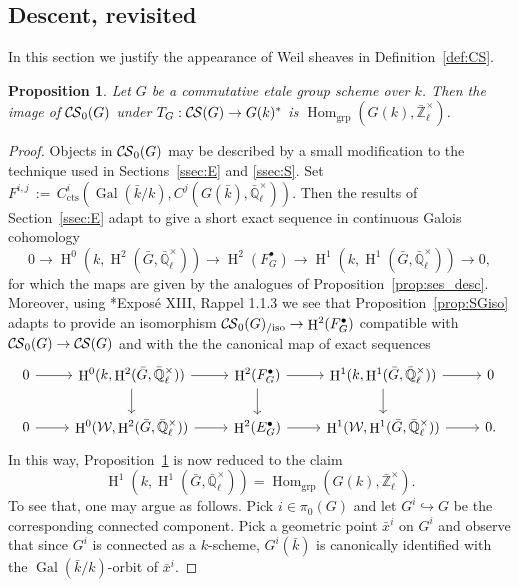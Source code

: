 \documentclass[10pt]{amsart}
\theoremstyle{plain}
\newtheorem{proposition}[theorem]{Proposition}
\theoremstyle{definition}
\theoremstyle{remark}
\newcommand{\EE}{\mathbb{\bar Q}_\ell}
\newcommand{\bFq}{\bar{k}}
\newcommand{\Fq}{k}
\newcommand{\EEx}{\EE^\times}
\newcommand{\Weil}[1]{\mathcal{W}_{#1}}
\DeclareMathOperator{\Gal}{Gal}
\DeclareMathOperator{\Hom}{Hom}
\DeclareMathOperator{\Hh}{H}
\newcommand{\ceq}{{\, :=\, }}
\newcommand{\TrFrob}[1]{T_{#1}}
\newcommand{\CS}{{\mathcal{C\hskip-0.8pt S}}}
\newcommand{\bCS}{{\CS_0}}
\newcommand{\bCSiso}[1]{\bCS(#1)_{/\text{iso}}}
\begin{document}
\subsection{Descent, revisited}\label{ssec:bS}

In this section we justify the appearance of Weil sheaves in Definition~\ref{def:CS}.

\begin{proposition}\label{prop:bounded-etale}
Let $G$ be a commutative etale group scheme over $\Fq$.
Then the image of $\bCS(G)$ under $\TrFrob{G} : \CS(G) \to G(\Fq)^*$ is $\Hom_\text{grp}(G(\Fq),\mathbb{\bar Z}_{\ell}^\times)$.
\end{proposition}

\begin{proof}
Objects in $\bCS(G)$ may be described by a small modification to the technique used in Sections~\ref{ssec:E} and \ref{ssec:S}. 
Set $F^{i,j} \ceq C^i_{\text{cts}} (\Gal(\bFq/\Fq), C^j(G(\bFq), \EEx))$.
Then the results of Section~\ref{ssec:E} adapt to give a short exact sequence in continuous Galois cohomology
 \[
    0 \to
    \Hh^0(\Fq,\Hh^2({\bar G},\EEx)) \to
    \Hh^2(F^\bullet_G) \to
    \Hh^1(\Fq,\Hh^1({\bar G},\EEx)) \to
    0,
 \]
for which the maps are given by the analogues of Proposition~\ref{prop:ses_desc}.
Moreover, using \cite{deligne-katz:SGA7.2}*{Expos\'e XIII, Rappel 1.1.3} we see that Proposition~\ref{prop:SGiso} adapts to provide an isomorphism $\bCSiso{G}\to \Hh^2(F^\bullet_G)$ compatible with $\bCS(G) \to \CS(G)$ and with the
the canonical map of exact sequences 
 \[
\begin{tikzcd}
    0 \arrow{r} &
    \Hh^0(\Fq,\Hh^2({\bar G},\EEx)) \arrow{r} \arrow{d} &
    \Hh^2(F^\bullet_G) \arrow{r} \arrow{d} &
    \Hh^1(\Fq,\Hh^1({\bar G},\EEx)) \arrow{r} \arrow{d} &
    0
\\
    0 \arrow{r} & 
    \Hh^0(\Weil{},\Hh^2({\bar G},\EEx)) \arrow{r} & 
    \Hh^2(E^\bullet_G) \arrow{r} & 
    \Hh^1(\Weil{},\Hh^1({\bar G},\EEx)) \arrow{r} &
    0.
\end{tikzcd}
 \]
In this way, Proposition~\ref{prop:bounded-etale} is now reduced to the claim
\[
\Hh^1(\Fq,\Hh^1({\bar G},\EEx)) = \Hom_\text{grp}(G(\Fq),\mathbb{\bar Z}_{\ell}^\times).
\]
To see that, one may argue as follows. 
Pick $i\in \pi_0(G)$ and let $G^i \hookrightarrow G$ be the corresponding connected component. 
Pick a geometric point ${\bar x}^i$ on $G^i$ and observe that since $G^i$ is connected as a $\Fq$-scheme, $G^i(\bFq)$ is canonically identified with the $\Gal(\bFq/\Fq)$-orbit of ${\bar x}^i$. 

\end{proof}
\end{document}
